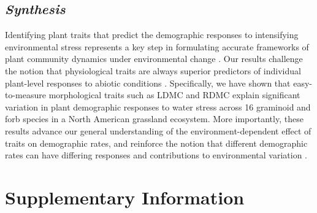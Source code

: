 \documentclass[12pt, letterpaper]{article}
\begin{document}
\subsection{\textit{Synthesis}} Identifying plant traits that predict the demographic responses to intensifying environmental stress represents a key step in formulating accurate frameworks of plant community dynamics under environmental change \citep{Laughlin2020TheFitness}. Our results challenge the notion that physiological traits are always superior predictors of individual plant-level responses to abiotic conditions \citep{Volaire2018}. Specifically, we have shown that easy-to-measure morphological traits such as LDMC and RDMC explain significant variation in plant demographic responses to water stress across 16 graminoid and forb species in a North American grassland ecosystem. More importantly, these results advance our general understanding of the environment-dependent effect of traits on demographic rates, and reinforce the notion that different demographic rates can have differing responses and contributions to environmental variation \citep{Laughlin2020TheFitness}. 





\renewcommand{\thetable}{S\arabic{table}} %
\setcounter{table}{0} %
\renewcommand{\thefigure}{S\arabic{figure}} %
\setcounter{figure}{0} %


\section{Supplementary Information}
\end{document}
